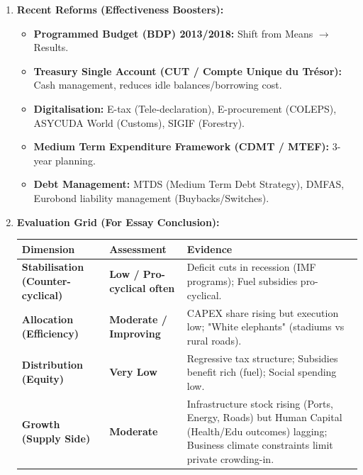 \documentclass[11pt]{article}
\begin{document}
\begin{methode}
\begin{enumerate}
\begin{enumerate}
        \item \textbf{Governance/Leakages:} Ghost workers, Over-invoicing, Weak PFM (Public Financial Management) - PEFA scores low on predictability/control.
        \item \textbf{External Shocks:} Oil Price, COVID, Russia-Ukraine (Wheat/Fertilizer/Fuel prices), Climate (Floods North, Droughts).
    \end{enumerate}
    \item \textbf{Recent Reforms (Effectiveness Boosters):}
    \begin{itemize}
        \item \textbf{Programmed Budget (BDP) 2013/2018:} Shift from Means $\rightarrow$ Results.
        \item \textbf{Treasury Single Account (CUT / Compte Unique du Trésor):} Cash management, reduces idle balances/borrowing cost.
        \item \textbf{Digitalisation:} E-tax (Tele-declaration), E-procurement (COLEPS), ASYCUDA World (Customs), SIGIF (Forestry).
        \item \textbf{Medium Term Expenditure Framework (CDMT / MTEF):} 3-year planning.
        \item \textbf{Debt Management:} MTDS (Medium Term Debt Strategy), DMFAS, Eurobond liability management (Buybacks/Switches).
    \end{itemize}
    \item \textbf{Evaluation Grid (For Essay Conclusion):} 
    \begin{center}
    \begin{tabularx}{\linewidth}{|l|X|X|}
    \hline
    \rowcolor{popblueL} \textbf{Dimension} & \textbf{Assessment} & \textbf{Evidence} \\
    \hline
    \textbf{Stabilisation (Counter-cyclical)} & \textbf{Low / Pro-cyclical often} & Deficit cuts in recession (IMF programs); Fuel subsidies pro-cyclical. \\
    \hline
    \textbf{Allocation (Efficiency)} & \textbf{Moderate / Improving} & CAPEX share rising but execution low; "White elephants" (stadiums vs rural roads). \\
    \hline
    \textbf{Distribution (Equity)} & \textbf{Very Low} & Regressive tax structure; Subsidies benefit rich (fuel); Social spending low. \\
    \hline
    \textbf{Growth (Supply Side)} & \textbf{Moderate} & Infrastructure stock rising (Ports, Energy, Roads) but Human Capital (Health/Edu outcomes) lagging; Business climate constraints limit private crowding-in. \\
    \hline
    \end{tabularx}
    \end{center}
\end{enumerate}
\end{methode}
\end{document}
